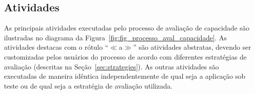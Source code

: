 \documentclass[12pt]{article}
\begin{document}


%


\subsection{Atividades}

As principais atividades executadas pelo processo de avaliação de capacidade são ilustradas no diagrama da Figura~\ref{fig:fig_processo_aval_capacidade}. As atividades destacas com o rótulo ``\mbox{\boldmath$\ll${\sc a}$\gg$}'' são atividades abstratas, devendo ser customizadas pelos usuários do processo de acordo com diferentes estratégias de avaliação (descritas na Seção~\ref{sec:strategies}). As outras atividades são executadas de maneira idêntica independentemente de qual seja a aplicação sob teste ou de qual seja a estratégia de avaliação utilizada. 
\end{document}
